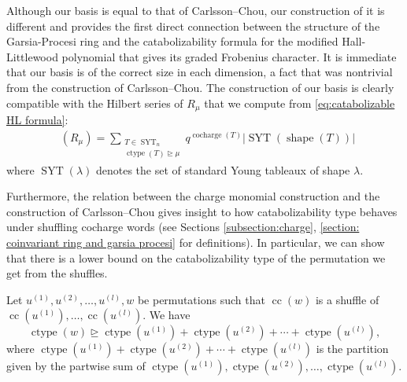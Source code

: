 \documentclass[ALCO, Unicode]{cedram}
\DeclareMathOperator{\cocharge}{cocharge}
\DeclareMathOperator{\syt}{SYT}
\DeclareMathOperator{\ctype}{ctype}
\DeclareMathOperator{\Hilb}{Hilb}
\DeclareMathOperator{\shape}{shape}
\DeclareMathOperator{\cc}{cc}
\DeclareMathOperator{\Hilbq}{\Hilb_q}
\begin{document}
Although our basis is equal to that of Carlsson--Chou, our construction of it is different and provides the first direct connection between the structure of the Garsia-Procesi ring and the catabolizability formula for the modified Hall-Littlewood polynomial that gives its graded Frobenius character. 
It is immediate that our basis is of the correct size in each dimension, a fact that was nontrivial from the construction of Carlsson--Chou. 
The construction of our basis is clearly compatible with the Hilbert series of $R_{\mu}$ that we compute from \eqref{eq:catabolizable HL formula}:
\begin{align}
    \Hilbq(R_{\mu})= \sum\limits_{\substack{T\in \syt_n\\  \ctype(T)\unrhd\mu}}  q^{\cocharge(T)} |\syt(\shape(T))|
\end{align}
where $\syt(\lambda)$ denotes the set of standard Young tableaux of shape $\lambda$.

Furthermore, the relation between the charge monomial construction and the construction of Carlsson--Chou gives insight to how catabolizability type behaves under shuffling cocharge words  (see Sections \ref{subsection:charge}, \ref{section: coinvariant ring and garsia procesi} for definitions). In particular, we can show that there is a lower bound on the catabolizability type of the permutation we get from the shuffles.

\begin{thm2}
    Let $u^{(1)}, u^{(2)}, \dots, u^{(l)}, w$ be
    permutations such that $\cc(w)$ is a shuffle of $\cc(u^{(1)}),\dots, \cc(u^{(l)})$.
    We have
    \[\ctype(w) \unrhd \ctype(u^{(1)}) + \ctype( u^{(2)}) + \cdots+ \ctype(u^{(l)}),\]
    where $\ctype(u^{(1)}) + \ctype( u^{(2)}) + \cdots +  \ctype(u^{(l)})$ is the partition given by the partwise sum of $\ctype(u^{(1)}),\ctype( u^{(2)}),\dots,\ctype(u^{(l)})$.
\end{thm2}
\end{document}
